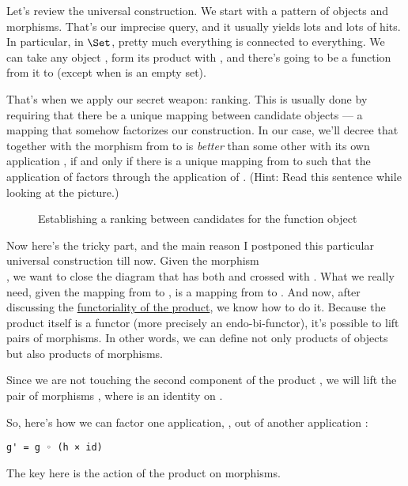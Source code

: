 Let's review the universal construction. We start with a pattern of
objects and morphisms. That's our imprecise query, and it usually yields
lots and lots of hits. In particular, in $\Set$, pretty much
everything is connected to everything. We can take any object
, form its product with , and there's going to be a
function from it to  (except when  is an empty set).

That's when we apply our secret weapon: ranking. This is usually done by
requiring that there be a unique mapping between candidate objects --- a
mapping that somehow factorizes our construction. In our case, we'll
decree that  together with the morphism  from
 to  is \emph{better} than some other
 with its own application , if and
only if there is a unique mapping  from  to
 such that the application of  factors
through the application of . (Hint: Read this sentence while
looking at the picture.)

\begin{figure}
\centering
{}
\caption{Establishing a ranking between candidates for the function object}
\end{figure}

Now here's the tricky part, and the main reason I postponed this
particular universal construction till now. Given the morphism\\
, we want to close the diagram
that has both  and  crossed with .
What we really need, given the mapping  from 
to , is a mapping from  to .
And now, after discussing the \hyperref[functoriality]{functoriality
of the product}, we know how to do it. Because the product itself is a
functor (more precisely an endo-bi-functor), it's possible to lift pairs
of morphisms. In other words, we can define not only products of objects
but also products of morphisms.

Since we are not touching the second component of the product
, we will lift the pair of morphisms
, where  is an identity on .

So, here's how we can factor one application, , out of another
application :

\begin{Verbatim}[commandchars=\\\{\}]
g' = g ◦ (h × id)
\end{Verbatim}
The key here is the action of the product on morphisms.

